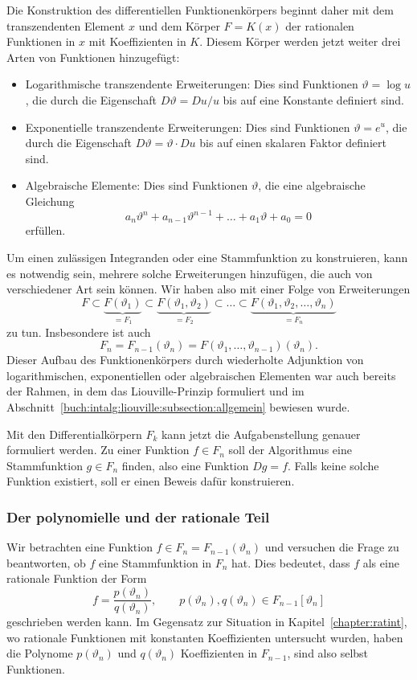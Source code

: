 Die Konstruktion des differentiellen Funktionenkörpers beginnt daher
mit dem trans\-zen\-den\-ten Element $x$ und dem Körper $F=K(x)$ der rationalen
Funktionen in $x$ mit Koeffizienten in $K$.
Diesem Körper werden jetzt weiter drei Arten von Funktionen hinzugefügt:
\begin{itemize}
\item
Logarithmische transzendente Erweiterungen: Dies sind Funktionen $\vartheta=\log u$,
die durch die Eigenschaft $D\vartheta= Du/u$ bis auf eine Konstante
definiert sind.
\item
Exponentielle transzendente Erweiterungen: Dies sind Funktionen $\vartheta=e^u$,
die durch die Eigenschaft $D\vartheta = \vartheta\cdot Du$ bis auf einen
skalaren Faktor definiert sind.
\item
Algebraische Elemente: Dies sind Funktionen $\vartheta$, die eine algebraische
Gleichung
\[
a_n\vartheta^n + a_{n-1}\vartheta^{n-1} + \dots + a_1\vartheta + a_0 = 0
\]
erfüllen.
\end{itemize}
Um einen zulässigen Integranden oder eine Stammfunktion zu konstruieren,
kann es notwendig sein, mehrere solche Erweiterungen hinzufügen, die auch
von verschiedener Art sein können.
Wir haben also mit einer Folge von Erweiterungen
\[
F
\subset
\underbrace{
F(\vartheta_1)
}_{\displaystyle = F_1}
\subset
\underbrace{
F(\vartheta_1,\vartheta_2)
}_{\displaystyle = F_2}
\subset
\dots
\subset
\underbrace{
F(\vartheta_1,\vartheta_2,\dots,\vartheta_n)
}_{\displaystyle=F_n}
\]
zu tun.
Insbesondere ist auch
\[
F_n = F_{n-1}(\vartheta_n)=F(\vartheta_1,\dots,\vartheta_{n-1})(\vartheta_n).
\]
Dieser Aufbau des Funktionenkörpers durch wiederholte Adjunktion von 
logarithmischen, exponentiellen oder algebraischen Elementen war auch
bereits der Rahmen, in dem das Liouville-Prinzip formuliert und im
Abschnitt~\ref{buch:intalg:liouville:subsection:allgemein}
bewiesen wurde.

Mit den Differentialkörpern $F_k$ kann jetzt die Aufgabenstellung 
genauer formuliert werden.
Zu einer Funktion $f\in F_n$ soll der Algorithmus eine Stammfunktion
$g\in F_n$ finden, also eine Funktion $Dg=f$.
Falls keine solche Funktion existiert, soll er einen Beweis dafür
konstruieren.

%
%
\subsubsection{Der polynomielle und der rationale Teil}
Wir betrachten eine Funktion $f\in F_n = F_{n-1}(\vartheta_n)$ und
versuchen die Frage zu beantworten, ob $f$ eine Stammfunktion in
$F_n$ hat.
Dies bedeutet, dass $f$ als eine rationale Funktion der Form
\begin{equation}
f
= 
\frac{p(\vartheta_n)}{q(\vartheta_n)},
\qquad
p(\vartheta_n), q(\vartheta_n)\in F_{n-1}[\vartheta_n]
\label{buch:intalg:risch:uebersicht:eqn:integrand}
\end{equation}
geschrieben werden kann.
Im Gegensatz zur Situation in Kapitel~\ref{chapter:ratint}, wo rationale
Funktionen mit konstanten Koeffizienten untersucht wurden, haben
die Polynome $p(\vartheta_n)$ und $q(\vartheta_n)$ Koeffizienten
in $F_{n-1}$, sind also selbst Funktionen.

